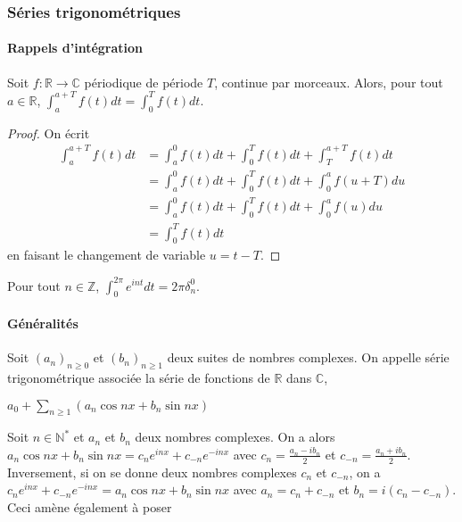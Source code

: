 

\subsubsection{Séries trigonométriques}

\paragraph{Rappels d'intégration}
\smallskip
\begin{lem}
Soit $f : \mathbb{R} \rightarrow \mathbb{C}$ périodique de période $T$, continue par
morceaux. Alors, pour tout $a \in \mathbb{R}$, $\int_a^{a+T} f(t) dt = \int_0^T f(t) dt$.
\end{lem}

\begin{proof}
On écrit 
\begin{align*}
\int_a^{a+T} f(t) dt &= \int_a^0 f(t) dt + \int_0^T f(t) dt + \int_T^{a+T} f(t) dt \\
&= \int_a^0 f(t) dt + \int_0^T f(t) dt + \int_0^a f(u+T) du \\
&= \int_a^0 f(t) dt + \int_0^T f(t) dt + \int_0^a f(u) du \\
&= \int_0^T f(t) dt
\end{align*}
en faisant le changement de variable $u = t - T$.
\end{proof}

\begin{lem}
Pour tout $n \in \mathbb{Z}$, $\int_0^{2\pi} e^{int} dt = 2\pi \delta_n^0$.
\end{lem}

\paragraph{Généralités}

\begin{de}
Soit $(a_n)_{n \geq 0}$ et
$(b_n)_{n \geq 1}$ deux suites de nombres complexes. On appelle
série trigonométrique associée la série de fonctions de $\mathbb{R}$ dans $\mathbb{C}$,

$a_0 + \sum_{n \geq 1} (a_n \cos nx + b_n \sin nx)$
\end{de}

\begin{rem}
Soit $n \in \mathbb{N}^*$ et $a_n$ et $b_n$
deux nombres complexes. On a alors 
$a_n \cos nx + b_n \sin nx = c_n e^{inx} + c_{-n} e^{-inx}$ 
avec
$c_n = \frac{a_n - ib_n}{2}$ et
$c_{-n} = \frac{a_n + ib_n}{2}$.
Inversement, si on se donne deux nombres complexes $c_n$ et
$c_{-n}$, on a $c_n e^{inx} + c_{-n} e^{-inx} = a_n \cos nx + b_n \sin nx$ avec
$a_n = c_n + c_{-n}$ et $b_n = i(c_n - c_{-n})$. Ceci amène également à poser
\end{rem}

